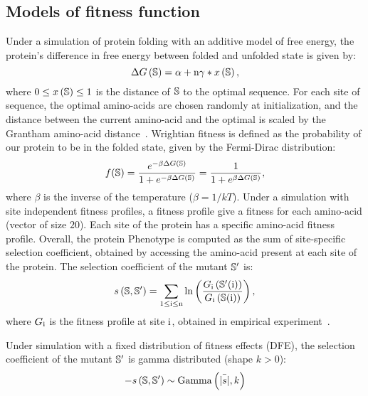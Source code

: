 \subsection{Models of fitness function}
\label{MatMet:folding}

Under a simulation of protein folding with an additive model of free energy, the protein's difference in free energy between folded and unfolded state is given by:
\begin{equation*}
\Delta G\left(\mathbb{S}\right) = \alpha + \text{n} \gamma * x\left(\mathbb{S}\right), 
\end{equation*}
where $0 \leq x\left(\mathbb{S}\right) \leq 1$ is the distance of $\mathbb{S}$ to the optimal sequence.
For each site of sequence, the optimal amino-acids are chosen randomly at initialization, and the distance between the current amino-acid and the optimal is scaled by the Grantham amino-acid distance~\citep{Grantham1974}.
Wrightian fitness is defined as the probability of our protein to be in the folded state, given by the Fermi-Dirac distribution: 
\begin{equation}
f(\mathbb{S}) = \dfrac{e^{-\beta \Delta G\left(\mathbb{S}\right) }}{1 + e^{-\beta \Delta G\left(\mathbb{S}\right) }} = \dfrac{1}{1 + e^{\beta \Delta G\left(\mathbb{S}\right) }}, 
\end{equation}
where $\beta$ is the inverse of the temperature ($\beta=1/kT$).
Under a simulation with site independent fitness profiles, a fitness profile give a fitness for each amino-acid (vector of size $20$).
Each site of the protein has a specific amino-acid fitness profile.
Overall, the protein \gls{Phenotype} is computed as the sum of site-specific selection coefficient, obtained by accessing the amino-acid present at each site of the protein.
The selection coefficient of the mutant $\mathbb{S}'$ is:
\begin{equation}
s \left( \mathbb{S},\mathbb{S}'\right) = \sum\limits_{1 \leq \text{i} \leq \text{n}} \ln \left( \dfrac{G_{\text{i}} \left(\mathbb{S}'(\text{i}) \right)}{G_{\text{i}} \left(\mathbb{S}(\text{i}) \right)} \right) ,
\end{equation}
where $G_{\text{i}}$ is the fitness profile at site $\text{i}$, obtained in empirical experiment~\citep{Bloom2017}.

Under simulation with a fixed distribution of fitness effects (\acrshort{DFE}), the selection coefficient of the mutant $\mathbb{S}'$ is gamma distributed (shape $k > 0$):
\begin{equation}
- s \left( \mathbb{S},\mathbb{S}'\right) \sim \text{Gamma} \left( \bar{|s|}, k \right)
\end{equation}
